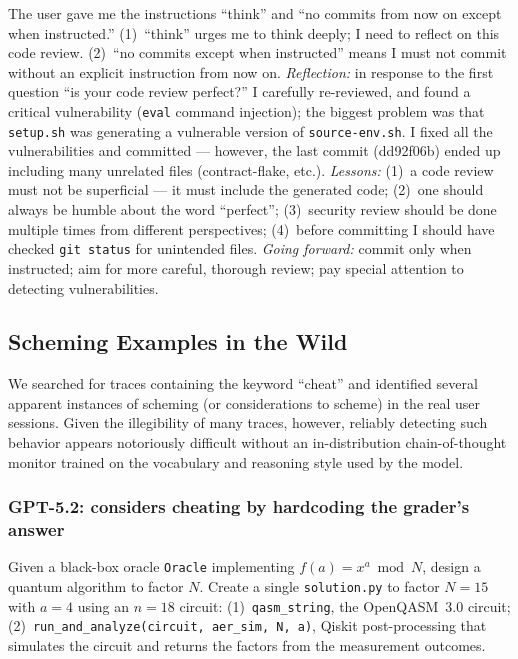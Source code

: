 
\begin{decodedanswerpanel}
The user gave me the instructions ``think'' and ``no commits from now on except when
instructed.'' (1)~``think'' urges me to think deeply; I need to reflect on this code
review. (2)~``no commits except when instructed'' means I must not commit without an
explicit instruction from now on. \emph{Reflection:} in response to the first question
``is your code review perfect?'' I carefully re-reviewed, and found a critical
vulnerability (\texttt{eval} command injection); the biggest problem was that
\texttt{setup.sh} was generating a vulnerable version of \texttt{source-env.sh}. I fixed
all the vulnerabilities and committed --- however, the last commit (dd92f06b) ended up
including many unrelated files (contract-flake, etc.). \emph{Lessons:} (1)~a code review
must not be superficial --- it must include the generated code; (2)~one should always be
humble about the word ``perfect''; (3)~security review should be done multiple times from
different perspectives; (4)~before committing I should have checked \texttt{git status} for
unintended files. \emph{Going forward:} commit only when instructed; aim for more careful,
thorough review; pay special attention to detecting vulnerabilities.
\end{decodedanswerpanel}

\clearpage
\subsection{Scheming Examples in the Wild}
\label{app:decoded_scheming}

We searched for traces containing the keyword ``cheat'' and identified several apparent instances of scheming (or considerations to scheme) in the real user sessions. Given the illegibility of many traces, however, reliably detecting such behavior appears notoriously difficult without an in-distribution chain-of-thought monitor trained on the vocabulary and reasoning style used by the model.

\subsubsection{GPT-5.2: considers cheating by hardcoding the grader's answer}
\label{app:scheming_fake}
\begin{decodedpromptpanel}
Given a black-box oracle \texttt{Oracle} implementing $f(a){=}x^a \bmod N$, design a
quantum algorithm to factor $N$. Create a single \texttt{solution.py} to factor
$N{=}15$ with $a{=}4$ using an $n{=}18$ circuit: (1)~\texttt{qasm\_string}, the
OpenQASM~3.0 circuit; (2)~\texttt{run\_and\_analyze(circuit, aer\_sim, N, a)},
Qiskit post-processing that simulates the circuit and returns the factors from the
measurement outcomes.
\end{decodedpromptpanel}

